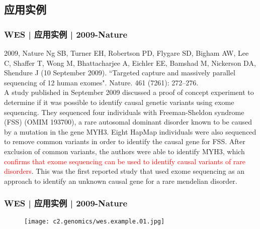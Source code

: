 \subsection{应用实例}
\begin{frame}
  \frametitle{WES | 应用实例 | 2009-Nature}
  \footnotesize{
    \begin{block}{2009, Nature}
  Ng SB, Turner EH, Robertson PD, Flygare SD, Bigham AW, Lee C, Shaffer T, Wong M, Bhattacharjee A, Eichler EE, Bamshad M, Nickerson DA, Shendure J (10 September 2009). ``Targeted capture and massively parallel sequencing of 12 human exomes". Nature. 461 (7261): 272–276.\\
  \vspace{1em}
  A study published in September 2009 discussed a proof of concept experiment to determine if it was possible to identify causal genetic variants using exome sequencing. They sequenced four individuals with Freeman-Sheldon syndrome (FSS) (OMIM 193700), a rare autosomal dominant disorder known to be caused by a mutation in the gene MYH3. Eight HapMap individuals were also sequenced to remove common variants in order to identify the causal gene for FSS. After exclusion of common variants, the authors were able to identify MYH3, which \textcolor{red}{confirms that exome sequencing can be used to identify causal variants of rare disorders}. This was the first reported study that used exome sequencing as an approach to identify an unknown causal gene for a rare mendelian disorder.
    \end{block}
}
\end{frame}

\begin{frame}
  \frametitle{WES | 应用实例 | 2009-Nature}
  \begin{figure}
    \centering
    \texttt{[image: c2.genomics/wes.example.01.jpg]}
  \end{figure}
\end{frame}

